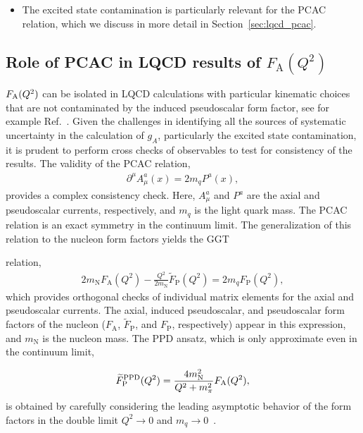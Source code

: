 \documentclass{ar-1col}
\begin{document}
\begin{itemize}[leftmargin=*]
\item The excited state contamination is particularly relevant for the PCAC relation, which we discuss in more detail in Section~\ref{sec:lqcd_pcac}.


\end{itemize}


\subsection{Role of PCAC in LQCD results of $F_{\mathrm{A}}(Q^2)$\label{sec:lqcd_pcac}}

$F_{\rm A}(Q^2)$ can be isolated in LQCD calculations with particular kinematic choices that are not contaminated by the induced pseudoscalar form factor, see for example Ref.~\cite{Gupta:2017dwj}.
Given the challenges in identifying all the sources of systematic uncertainty in the calculation of $g_A$, particularly the excited state contamination, it is prudent to perform cross checks of observables to test for consistency of the results.
The validity of the PCAC relation,
\begin{align}
 \partial^\mu A^{a}_{\mu}(x) = 2 m_q P^{a}(x),
 \label{eq:pcac}
\end{align}
provides a complex consistency check.
Here, $A^{a}_\mu$ and $P^{a}$ are the axial and pseudoscalar currents,
 respectively, and $m_q$ is the light quark mass.
The PCAC relation is an exact symmetry in the continuum limit.
The generalization of this relation to the nucleon form factors
 yields the GGT%
 \begin{marginnote}
 \end{marginnote}%
 relation,
\begin{align}
 2 m_{\mathrm{N}} F_{\mathrm{A}}(Q^2) -\frac{Q^2}{2m_{\mathrm{N}}} \widetilde{F}_{\mathrm{P}}(Q^2) = 2 m_q F_{\mathrm{P}}(Q^2),
 \label{eq:ggt}
\end{align}
 which provides orthogonal checks of individual matrix elements
 for the axial and pseudoscalar currents.
The axial, induced pseudoscalar, and pseudoscalar form factors of the nucleon
 ($F_{\mathrm{A}}$, $\widetilde{F}_{\mathrm{P}}$, and $F_{\mathrm{P}}$, respectively) appear in this expression,
 and $m_{\mathrm{N}}$ is the nucleon mass.
The PPD ansatz, which is only approximate even in the continuum limit,%
\begin{marginnote}
 \end{marginnote}%
\begin{align}
 \widetilde{F}^{\rm PPD}_{\mathrm{P}}(Q^2) = \frac{4m_{\mathrm{N}}^2}{Q^2+m_\pi^2} F_{\mathrm{A}}(Q^2),
 \label{eq:ppd}
\end{align}
is obtained
 by carefully considering the leading asymptotic behavior of the
 form factors in the double limit $Q^2\to0$ and $m_q\to0$~\cite{Sasaki:2007gw}.
\end{document}
